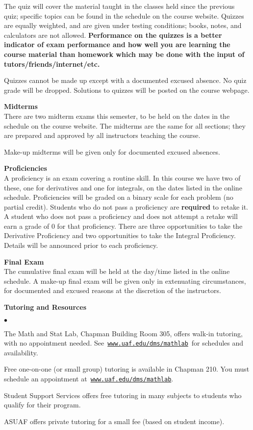 \documentclass[12pt]{article}
\renewcommand{\emph}[1]{\textsf{\textbf{#1}}}
\newcommand{\localhead}[1]{\par\smallskip\textbf{#1}\nobreak\\}%
\def\heading#1{\localhead{\large\emph{#1}}}
\newenvironment{clist}%
{\bgroup\parskip 0pt\begin{list}{$\bullet$}{\partopsep 4pt\topsep 0pt\itemsep -2pt}}%
{\end{list}\egroup}%
\begin{document}
The quiz will cover the material taught in the classes held since the previous quiz; specific topics can be found in the schedule on the course website.  Quizzes are equally weighted, and are given under testing conditions; books, notes, and calculators are not allowed.  \textbf{Performance on the quizzes is a better indicator of exam performance and how well you are learning the course material than homework which may be done with the input of tutors/friends/internet/etc.}

Quizzes cannot be made up except with a documented excused absence.  No quiz grade will be dropped. Solutions to quizzes will be posted on the course webpage.

\heading{Midterms}
There are two midterm exams this semester, to be held on the dates in the schedule on the course website.  The midterms are the same for all sections; they are prepared and approved by all instructors teaching the course. 

Make-up midterms will be given only for documented excused absences.

\heading{Proficiencies}
A proficiency is an exam covering a routine skill.  In this course we have two of these, one for derivatives and one for integrals, on the dates listed in the online schedule.  Proficiencies will be graded on a binary scale for each problem (no partial credit).  Students who do not pass a proficiency are \textbf{required} to retake it. A student who does not pass a proficiency and does not attempt a retake will earn a grade of 0 for that proficiency. There are three opportunities to take the Derivative Proficiency and two opportunities to take the Integral Proficiency. Details will be announced prior to each proficiency.

\heading{Final Exam}
The cumulative final exam will be held at the day/time listed in the online schedule. A make-up final exam will be given only in extenuating circumstances, for documented and excused reasons at the discretion of the instructors.

\heading{Tutoring and Resources}
\vskip -30pt\strut
\begin{clist}
	\item The Math and Stat Lab, Chapman Building Room 305, offers walk-in tutoring, with no appointment needed.  See\, \href{http://www.uaf.edu/dms/mathlab/}{\texttt{www.uaf.edu/dms/mathlab}}\, for schedules and availability.
	\item Free one-on-one (or small group) tutoring is available in Chapman 210. You must schedule an appointment at\, \href{http://www.uaf.edu/dms/mathlab/}{\texttt{www.uaf.edu/dms/mathlab}}.
	\item Student Support Services offers free tutoring in many subjects to students who qualify for their program.
	\item ASUAF offers private tutoring for a small fee (based on student income).
\end{clist}
\end{document}
